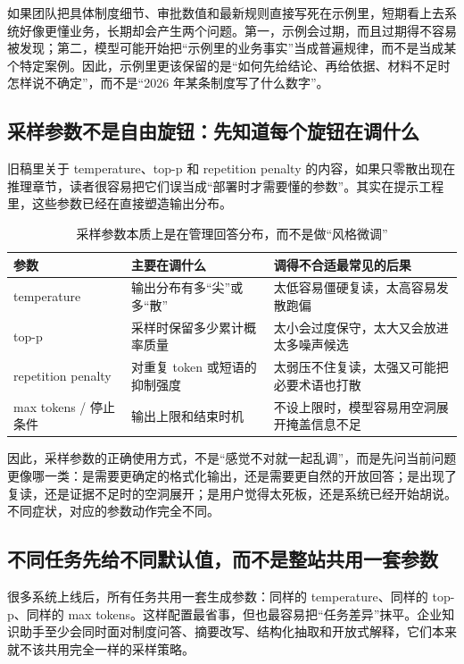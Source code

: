 如果团队把具体制度细节、审批数值和最新规则直接写死在示例里，短期看上去系统好像更懂业务，长期却会产生两个问题。第一，示例会过期，而且过期得不容易被发现；第二，模型可能开始把“示例里的业务事实”当成普遍规律，而不是当成某个特定案例。因此，示例里更该保留的是“如何先给结论、再给依据、材料不足时怎样说不确定”，而不是“2026 年某条制度写了什么数字”。

\subsection{采样参数不是自由旋钮：先知道每个旋钮在调什么}
旧稿里关于 temperature、top-p 和 repetition penalty 的内容，如果只零散出现在推理章节，读者很容易把它们误当成“部署时才需要懂的参数”。其实在提示工程里，这些参数已经在直接塑造输出分布。

\begin{table}[H]
\centering
\small
\begin{tabularx}{\textwidth}{>{\raggedright\arraybackslash}p{2.8cm}>{\raggedright\arraybackslash}p{3.2cm}>{\raggedright\arraybackslash}X}
\toprule
\textbf{参数} & \textbf{主要在调什么} & \textbf{调得不合适最常见的后果} \\
\midrule
temperature & 输出分布有多“尖”或多“散” & 太低容易僵硬复读，太高容易发散跑偏 \\
top-p & 采样时保留多少累计概率质量 & 太小会过度保守，太大又会放进太多噪声候选 \\
repetition penalty & 对重复 token 或短语的抑制强度 & 太弱压不住复读，太强又可能把必要术语也打散 \\
max tokens / 停止条件 & 输出上限和结束时机 & 不设上限时，模型容易用空洞展开掩盖信息不足 \\
\bottomrule
\end{tabularx}
\caption{采样参数本质上是在管理回答分布，而不是做“风格微调”}
\label{tab:sampling-knobs}
\end{table}

因此，采样参数的正确使用方式，不是“感觉不对就一起乱调”，而是先问当前问题更像哪一类：是需要更确定的格式化输出，还是需要更自然的开放回答；是出现了复读，还是证据不足时的空洞展开；是用户觉得太死板，还是系统已经开始胡说。不同症状，对应的参数动作完全不同。

\subsection{不同任务先给不同默认值，而不是整站共用一套参数}
很多系统上线后，所有任务共用一套生成参数：同样的 temperature、同样的 top-p、同样的 max tokens。这样配置最省事，但也最容易把“任务差异”抹平。企业知识助手至少会同时面对制度问答、摘要改写、结构化抽取和开放式解释，它们本来就不该共用完全一样的采样策略。

